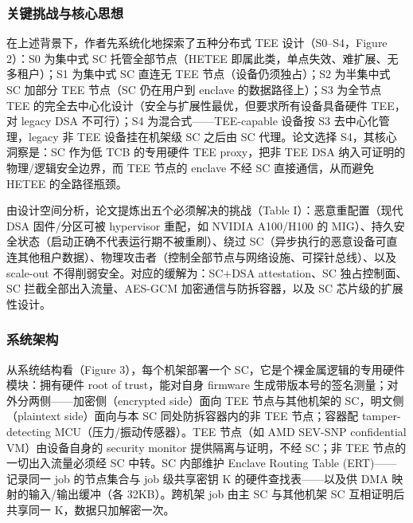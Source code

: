 \documentclass[11pt]{ctexart}
\begin{document}
\subsubsection{关键挑战与核心思想}
在上述背景下，作者先系统化地探索了五种分布式 TEE 设计（S0--S4，Figure 2）：S0 为集中式 SC 托管全部节点（HETEE 即属此类，单点失效、难扩展、无多租户）；S1 为集中式 SC 直连无 TEE 节点（设备仍须独占）；S2 为半集中式 SC 加部分 TEE 节点（SC 仍在用户到 enclave 的数据路径上）；S3 为全节点 TEE 的完全去中心化设计（安全与扩展性最优，但要求所有设备具备硬件 TEE，对 legacy DSA 不可行）；S4 为混合式——TEE-capable 设备按 S3 去中心化管理，legacy 非 TEE 设备挂在机架级 SC 之后由 SC 代理。论文选择 S4，其核心洞察是：SC 作为低 TCB 的专用硬件 TEE proxy，把非 TEE DSA 纳入可证明的物理/逻辑安全边界，而 TEE 节点的 enclave 不经 SC 直接通信，从而避免 HETEE 的全路径瓶颈。\par
由设计空间分析，论文提炼出五个必须解决的挑战（Table I）：恶意重配置（现代 DSA 固件/分区可被 hypervisor 重配，如 NVIDIA A100/H100 的 MIG）、持久安全状态（启动正确不代表运行期不被重刷）、绕过 SC（异步执行的恶意设备可直连其他租户数据）、物理攻击者（控制全部节点与网络设施、可探针总线）、以及 scale-out 不得削弱安全。对应的缓解为：SC+DSA attestation、SC 独占控制面、SC 拦截全部出入流量、AES-GCM 加密通信与防拆容器，以及 SC 芯片级的扩展性设计。\par
\subsubsection{系统架构}
从系统结构看（Figure 3），每个机架部署一个 SC，它是个裸金属逻辑的专用硬件模块：拥有硬件 root of trust，能对自身 firmware 生成带版本号的签名测量；对外分两侧——加密侧（encrypted side）面向 TEE 节点与其他机架的 SC，明文侧（plaintext side）面向与本 SC 同处防拆容器内的非 TEE 节点；容器配 tamper-detecting MCU（压力/振动传感器）。TEE 节点（如 AMD SEV-SNP confidential VM）由设备自身的 security monitor 提供隔离与证明，不经 SC；非 TEE 节点的一切出入流量必须经 SC 中转。SC 内部维护 Enclave Routing Table (ERT)——记录同一 job 的节点集合与 job 级共享密钥 K 的硬件查找表——以及供 DMA 映射的输入/输出缓冲（各 32KB）。跨机架 job 由主 SC 与其他机架 SC 互相证明后共享同一 K，数据只加解密一次。\par
\end{document}
